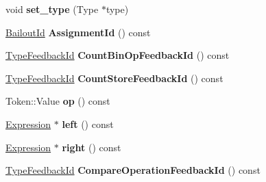 \begin{DoxyCompactItemize}
\item 
\hypertarget{classv8_1_1internal_1_1_v8___f_i_n_a_l_ad494c04eb5e1556955049ee72885d4ba}{}void {\bfseries set\+\_\+type} (Type $\ast$type)\label{classv8_1_1internal_1_1_v8___f_i_n_a_l_ad494c04eb5e1556955049ee72885d4ba}

\item 
\hypertarget{classv8_1_1internal_1_1_v8___f_i_n_a_l_a7dcaac465fea05a2016fbe314eb3a8e7}{}\hyperlink{classv8_1_1internal_1_1_bailout_id}{Bailout\+Id} {\bfseries Assignment\+Id} () const \label{classv8_1_1internal_1_1_v8___f_i_n_a_l_a7dcaac465fea05a2016fbe314eb3a8e7}

\item 
\hypertarget{classv8_1_1internal_1_1_v8___f_i_n_a_l_ab5f019379f9be9a0423db855bd11b327}{}\hyperlink{classv8_1_1internal_1_1_type_feedback_id}{Type\+Feedback\+Id} {\bfseries Count\+Bin\+Op\+Feedback\+Id} () const \label{classv8_1_1internal_1_1_v8___f_i_n_a_l_ab5f019379f9be9a0423db855bd11b327}

\item 
\hypertarget{classv8_1_1internal_1_1_v8___f_i_n_a_l_ac3add09421ddb7a27ab86f6b1047dbe7}{}\hyperlink{classv8_1_1internal_1_1_type_feedback_id}{Type\+Feedback\+Id} {\bfseries Count\+Store\+Feedback\+Id} () const \label{classv8_1_1internal_1_1_v8___f_i_n_a_l_ac3add09421ddb7a27ab86f6b1047dbe7}

\item 
\hypertarget{classv8_1_1internal_1_1_v8___f_i_n_a_l_a7888b5a094e42a12307cd150fdbe678f}{}Token\+::\+Value {\bfseries op} () const \label{classv8_1_1internal_1_1_v8___f_i_n_a_l_a7888b5a094e42a12307cd150fdbe678f}

\item 
\hypertarget{classv8_1_1internal_1_1_v8___f_i_n_a_l_ad0af0a356ee33837801209e5acc04d78}{}\hyperlink{classv8_1_1internal_1_1_expression}{Expression} $\ast$ {\bfseries left} () const \label{classv8_1_1internal_1_1_v8___f_i_n_a_l_ad0af0a356ee33837801209e5acc04d78}

\item 
\hypertarget{classv8_1_1internal_1_1_v8___f_i_n_a_l_a87f3521e7083bb8a9d897949faea074e}{}\hyperlink{classv8_1_1internal_1_1_expression}{Expression} $\ast$ {\bfseries right} () const \label{classv8_1_1internal_1_1_v8___f_i_n_a_l_a87f3521e7083bb8a9d897949faea074e}

\item 
\hypertarget{classv8_1_1internal_1_1_v8___f_i_n_a_l_ad910a19458e7ad095834c73377d0b4bd}{}\hyperlink{classv8_1_1internal_1_1_type_feedback_id}{Type\+Feedback\+Id} {\bfseries Compare\+Operation\+Feedback\+Id} () const \label{classv8_1_1internal_1_1_v8___f_i_n_a_l_ad910a19458e7ad095834c73377d0b4bd}


\end{DoxyCompactItemize}
